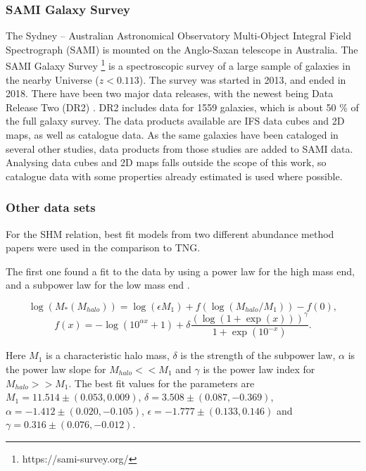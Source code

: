 \subsubsection{SAMI Galaxy Survey}
The Sydney – Australian Astronomical Observatory Multi-Object Integral Field Spectrograph (SAMI) is mounted on the Anglo-Saxan telescope in Australia. The SAMI Galaxy Survey \footnote{https://sami-survey.org/} is a spectroscopic survey of a large sample of galaxies in the nearby Universe ($z < 0.113$). The survey was started in 2013, and ended in 2018. There have been two major data releases, with the newest being Data Release Two (DR2) \parencite{Scott2018}. DR2 includes data for 1559 galaxies, which is about 50 \% of the full galaxy survey. The data products available are IFS data cubes and 2D maps, as well as catalogue data. As the same galaxies have been cataloged in several other studies, data products from those studies are added to SAMI data. Analysing data cubes and 2D maps falls outside the scope of this work, so catalogue data with some properties already estimated is used where possible. 

\subsubsection{Other data sets}
For the SHM relation, best fit models from two different abundance method papers were used in the comparison to TNG.

The first one found a fit to the data by using a power law for the high mass end, and a subpower law for the low mass end \parencite{Behroozi2013}.

\begin{equation} \label{eq_behroozi}
    \log(M_*(M_{halo})) = \log(\epsilon M_1) + f(\log(M_{halo}/M_1)) -f(0),
\end{equation}
\begin{equation*}
    f(x) = -\log(10^{\alpha x}+1)+\delta \frac{(\log(1+\exp(x)))^\gamma}{1 +\exp(10^{-x})}.
\end{equation*}

Here $M_1$ is a characteristic halo mass, $\delta$ is the strength of the subpower law, $\alpha$ is the power law slope for $M_{halo} << M_1$ and $\gamma$ is the power law index for $M_{halo} >> M_1$. The best fit values for the parameters are $M_1 = 11.514\pm(0.053, 0.009)$, $\delta = 3.508 \pm (0.087, -0.369)$, $\alpha = -1.412 \pm (0.020, -0.105)$, $\epsilon = -1.777 \pm (0.133, 0.146)$ and $\gamma = 0.316 \pm (0.076, -0.012)$.

